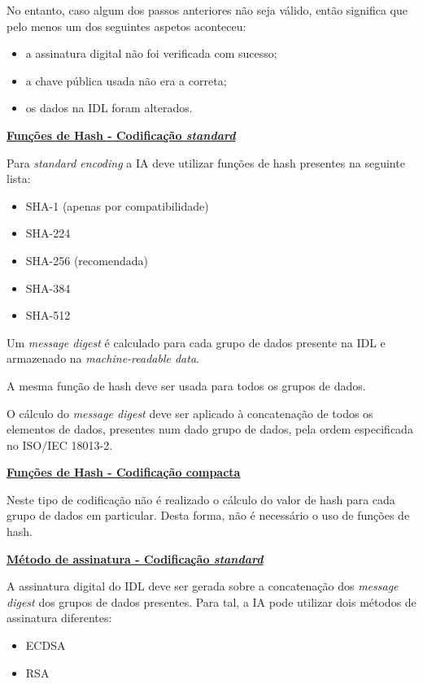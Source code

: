 No entanto, caso algum dos passos anteriores não seja válido, então significa
que pelo menos um dos seguintes aspetos aconteceu:
\begin{itemize}
\item a assinatura digital não foi verificada com sucesso;
\item a chave pública usada não era a correta;
\item os dados na IDL foram alterados.
\end{itemize}


\vspace{0.6cm}
\underline{\textbf{Funções de Hash - Codificação \emph{standard}}}
\vspace{0.3cm}

Para \emph{standard encoding} a IA deve utilizar funções de hash presentes na
seguinte lista:
\begin{itemize}
\item SHA-1 (apenas por compatibilidade)
\item SHA-224
\item SHA-256 (recomendada)
\item SHA-384
\item SHA-512
\end{itemize}

Um \emph{message digest} é calculado para cada grupo de dados presente na IDL e
armazenado na \emph{machine-readable data}.

A mesma função de hash deve ser usada para todos os grupos de dados.

O cálculo do \emph{message digest} deve ser aplicado à concatenação de todos os
elementos de dados, presentes num dado grupo de dados, pela ordem
especificada no ISO/IEC 18013-2.


\vspace{0.6cm}
\underline{\textbf{Funções de Hash - Codificação compacta}}
\vspace{0.3cm}

Neste tipo de codificação não é realizado o cálculo do valor de hash para
cada grupo de dados em particular. Desta forma, não é necessário o uso de
funções de hash.


\vspace{0.6cm}
\underline{\textbf{Método de assinatura - Codificação \emph{standard}}}
\vspace{0.3cm}

A assinatura digital do IDL deve ser gerada sobre a concatenação dos
\textit{message digest} dos grupos de dados presentes. Para tal, a IA pode utilizar
dois métodos de assinatura diferentes:
\begin{itemize}
\item ECDSA
\item RSA
\end{itemize}

